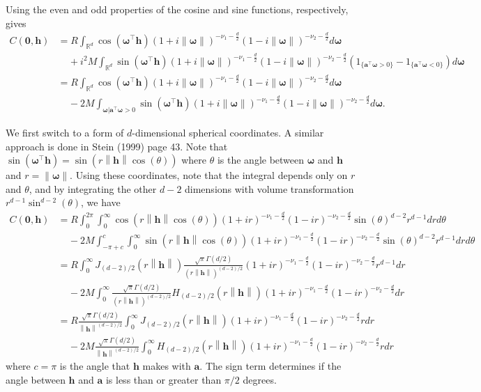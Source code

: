 \documentclass[11pt]{article}
\newcommand{\vint}{\boldsymbol{\omega}}
\newcommand{\vpla}{\boldsymbol{a}}
\newcommand{\hh}{\left\lVert \boldsymbol{h}\right\rVert}
\begin{document}
Using the even and odd properties of the cosine and sine functions, respectively, gives
\begin{align*}
C(\boldsymbol{0}, \boldsymbol{h})&=R\int_{\mathbb{R}^d}\cos(\vint^\top \boldsymbol{h}) (1 + i \left\lVert \vint \right\rVert )^{-\nu_1- \frac{d}{2}}(1 - i \left\lVert \vint \right\rVert )^{-\nu_2- \frac{d}{2}} d\vint \\
& \ \ \ \ \ + i^2M\int_{\mathbb{R}^d}\sin(\vint^\top \boldsymbol{h}) (1 + i \left\lVert \vint \right\rVert )^{-\nu_1- \frac{d}{2}}(1 - i \left\lVert \vint \right\rVert )^{-\nu_2- \frac{d}{2}} \left(1_{\{\vpla^\top\vint > 0\}}  - 1_{\{\vpla^\top\vint < 0\}}\right) d\vint \\
&=R\int_{\mathbb{R}^d}\cos(\vint^\top \boldsymbol{h}) (1 + i \left\lVert \vint \right\rVert )^{-\nu_1- \frac{d}{2}}(1 - i \left\lVert \vint \right\rVert )^{-\nu_2- \frac{d}{2}} d\vint \\
& \ \ \ \ \ -2M\int_{\vint | \vpla^\top\vint > 0}\sin(\vint^\top \boldsymbol{h}) (1 + i \left\lVert \vint \right\rVert )^{-\nu_1- \frac{d}{2}}(1 - i \left\lVert \vint \right\rVert )^{-\nu_2- \frac{d}{2}} d\vint .
\end{align*}

We first switch to a form of $d$-dimensional spherical coordinates. A similar approach is done in Stein (1999) page 43. Note that $\sin(\vint^\top \boldsymbol{h}) = \sin(r \left\lVert \boldsymbol{h}\right\rVert \cos(\theta))$ where $\theta$ is the angle between $\vint$ and $\boldsymbol{h}$ and $r = \left\lVert \vint \right\rVert$. Using these coordinates, note that the integral depends only on $r$ and $\theta$, and by integrating the other $d-2$ dimensions with volume transformation $r^{d-1}\sin^{d-2}(\theta)$, we have \begin{align*}
C(\boldsymbol{0}, \boldsymbol{h})&=R\int_0^{2\pi}\int_0^\infty \cos(r\hh\cos(\theta)) (1 + ir)^{-\nu_1- \frac{d}{2}}(1 - ir )^{-\nu_2- \frac{d}{2}} \sin(\theta)^{d-2} r^{d-1}dr d\theta \\
& \ \ \ \ \ -2M \int_{-\pi+c}^c\int_0^\infty \sin(r\hh\cos(\theta)) (1 + ir)^{-\nu_1- \frac{d}{2}}(1 - ir )^{-\nu_2- \frac{d}{2}} \sin(\theta)^{d-2} r^{d-1}dr d\theta \\
&=R\int_0^\infty J_{(d-2)/2}(r\hh)\frac{\sqrt{\pi}\Gamma(d/2)}{(r\hh)^{(d-2)/2}}(1 + ir)^{-\nu_1- \frac{d}{2}}(1 - ir )^{-\nu_2- \frac{d}{2}} r^{d-1}dr \\
& \ \ \ \ \ -2M\int_{0}^\infty \frac{\sqrt{\pi}\Gamma(d/2)}{(r \hh)^{(d-2)/2}} H_{(d-2)/2}(r\hh)(1 + ir)^{-\nu_1- \frac{d}{2}}(1 - ir )^{-\nu_2- \frac{d}{2}}dr \\
&=R\frac{\sqrt{\pi}\Gamma(d/2)}{\hh^{(d-2)/2}}\int_0^\infty J_{(d-2)/2}(r\hh)(1 + ir)^{-\nu_1- \frac{d}{2}}(1 - ir )^{-\nu_2- \frac{d}{2}} rdr \\
& \ \ \ \ \ -2M\frac{\sqrt{\pi}\Gamma(d/2)}{\hh^{(d-2)/2}}\int_0^\infty H_{(d-2)/2}(r\hh)(1 + ir)^{-\nu_1- \frac{d}{2}}(1 - ir )^{-\nu_2- \frac{d}{2}} rdr
\end{align*}where $c = \pi$ is the angle that $\boldsymbol{h}$ makes with $\boldsymbol{a}$. The sign term determines if the angle between $\boldsymbol{h}$ and $\boldsymbol{a}$ is less than or greater than $\pi/2$ degrees.
\end{document}
